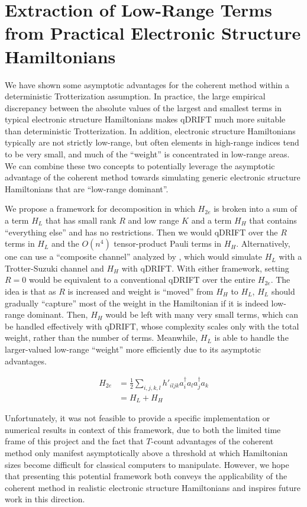 \section{Extraction of Low-Range Terms from Practical Electronic Structure Hamiltonians}

We have shown some asymptotic advantages for the coherent method within a deterministic Trotterization assumption. In practice, the large empirical discrepancy between the absolute values of the largest and smallest terms in typical electronic structure Hamiltonians makes qDRIFT much more suitable than deterministic Trotterization. In addition, electronic structure Hamiltonians typically are not strictly low-range, but often elements in high-range indices tend to be very small, and much of the ``weight'' is concentrated in low-range areas. We can combine these two concepts to potentially leverage the asymptotic advantage of the coherent method towards simulating generic electronic structure Hamiltonians that are ``low-range dominant''.

We propose a framework for decomposition in which $H_{2e}$ is broken into a sum of a term $H_L$ that has small rank $R$ and low range $K$ and a term $H_H$ that contains ``everything else'' and has no restrictions. Then we would qDRIFT over the $R$ terms in $H_L$ and the $O(n^4)$ tensor-product Pauli terms in $H_H$. Alternatively, one can use a ``composite channel'' analyzed by \cite{CompositeQDRIFT}, which would simulate $H_L$ with a Trotter-Suzuki channel and $H_H$ with qDRIFT.
With either framework, setting $R = 0$ would be equivalent to a conventional qDRIFT over the entire $H_{2e}$. The idea is that as $R$ is increased and weight is ``moved'' from $H_H$ to $H_L$, $H_L$ should gradually ``capture'' most of the weight in the Hamiltonian if it is indeed low-range dominant. Then, $H_H$ would be left with many very small terms, which can be handled effectively with qDRIFT, whose complexity scales only with the total weight, rather than the number of terms. Meanwhile, $H_L$ is able to handle the larger-valued low-range ``weight'' more efficiently due to its asymptotic advantages.

\begin{equation}
    \begin{split}
        H_{2e} &= \frac{1}{2}\sum_{i,j,k,l} h'_{iljk}a^\dag_ia_la^\dag_ja_k \\
        &= H_L + H_H
    \end{split}
\end{equation}

Unfortunately, it was not feasible to provide a specific implementation or numerical results in context of this framework, due to both the limited time frame of this project and the fact that $T$-count advantages of the coherent method only manifest asymptotically above a threshold at which Hamiltonian sizes become difficult for classical computers to manipulate. However, we hope that presenting this potential framework both conveys the applicability of the coherent method in realistic electronic structure Hamiltonians and inspires future work in this direction.



